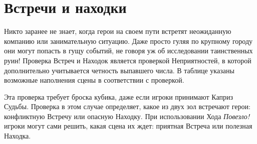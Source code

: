 \section{Встречи и находки}
Никто заранее не знает, когда герои на своем пути встретят неожиданную компанию или занимательную ситуацию. Даже просто гуляя по крупному городу они могут попасть в гущу событий, не говоря уж об исследовании таинственных руин!
\newline Проверка Встреч и Находок является проверкой Неприятностей, в которой дополнительно учитывается четность выпавшего числа. В таблице указаны возможные наполнения сцены в соответствии с проверкой.
\begin{tcolorbox}
Эта проверка требует броска кубика, даже если игроки принимают Каприз Судьбы. Проверка в этом случае определяет, какое из двух зол встречают герои: конфликтную Встречу или опасную Находку.
\newline При использовании Хода \textit{Повезло!} игроки могут сами решить, какая сцена их ждет: приятная Встреча или полезная Находка.
\end{tcolorbox}
